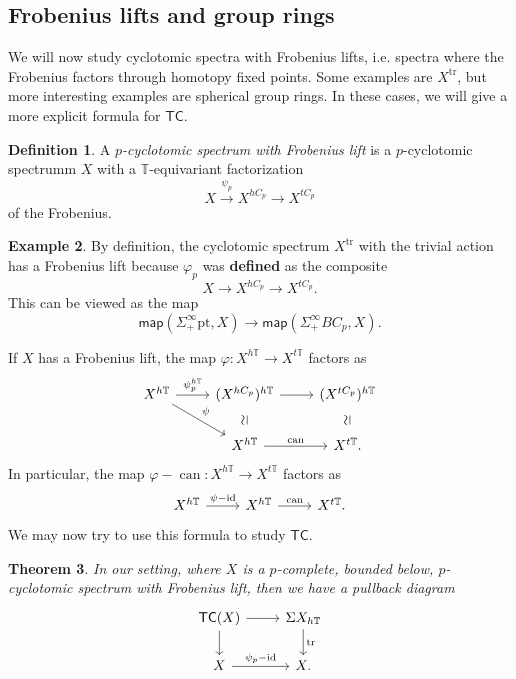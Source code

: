 \documentclass[10pt, oneside]{memoir}
\newtheorem{thm}{Theorem}[subsection]
\theoremstyle{definition}
\newtheorem{defn}[thm]{Definition}
\newtheorem{exm}[thm]{Example}
\theoremstyle{remark}
\theoremstyle{plain}
\theoremstyle{definition}
\theoremstyle{remark}
\newcommand{\T}{\mathbb{T}}
\newcommand{\mr}[1]{\mathrm{#1}}
\newcommand{\on}[1]{\operatorname{#1}}
\newcommand{\ms}[1]{\mathsf{#1}}
\newcommand{\1}{\mathbf{1}}
\newcommand{\2}{\mathbf{2}}
\newcommand{\3}{\mathbf{3}}
\newcommand{\pt}{\mr{pt}}
\newcommand{\TC}{\ms{TC}}
\begin{document}
\subsection{Frobenius lifts and group rings}%
\label{sub:Frobenius lifts and group rings}

We will now study cyclotomic spectra with Frobenius lifts, i.e. spectra where the Frobenius factors through homotopy fixed points. Some examples are \(X^{\mr{tr}} \), but more interesting examples are spherical group rings. In these cases, we will give a more explicit formula for \(\TC \).

\begin{defn}
    A \textit{\(p \)-cyclotomic spectrum with Frobenius lift} is a \(p \)-cyclotomic spectrumm \(X \) with a \(\T \)-equivariant factorization
    \[ X \xrightarrow{\psi_p} X^{hC_p} \to X^{t C_p} \]
    of the Frobenius.
\end{defn}

\begin{exm}
    By definition, the cyclotomic spectrum \(X^{\mr{tr}} \) with the trivial action has a Frobenius lift because \(\varphi_p \) was \textbf{defined} as the composite
    \[ X \to X^{hC_p} \to X^{t C_p}. \]
    This can be viewed as the map
    \[ \ms{map}(\Sigma_+^{\infty} \pt, X) \to \ms{map}(\Sigma_+^{\infty} BC_p, X). \]
\end{exm}

If \(X \) has a Frobenius lift, the map \(\varphi \colon X^{h\T} \to X^{t\T} \) factors as
\begin{equation*}
\begin{tikzcd}
    X^{h\T} \ar{dr}{\psi} \ar{r}{\psi_p^{h\T}} & (X^{hC_p})^{h\T} \ar{r} & (X^{tC_p})^{h\T} \\
    & X^{h\T} \ar[phantom,u,sloped,"\simeq"] \ar{r}{\on{can}} & X^{t\T} \ar[phantom,u,sloped,"\simeq"].
\end{tikzcd}
\end{equation*}
In particular, the map \(\varphi - \on{can} \colon X^{h\T} \to X^{t\T} \) factors as
\begin{equation*}
\begin{tikzcd}
    X^{h\T} \ar{r}{\psi - \mr{id}} & X^{h\T} \ar{r}{\on{can}} & X^{t\T}.
\end{tikzcd}
\end{equation*}
We may now try to use this formula to study \(\TC \).

\begin{thm}
    In our setting, where \(X \) is a \(p \)-complete, bounded below, \(p \)-cyclotomic spectrum with Frobenius lift, then we have a pullback diagram
    \begin{equation*}
    \begin{tikzcd}
        \TC(X) \ar{r} \ar{d} & \Sigma X_{h\T} \ar{d}{\on{tr}} \\
        X \ar{r}{\psi_p - \mr{id}} & X.
    \end{tikzcd}
    \end{equation*}
\end{thm}
\end{document}
